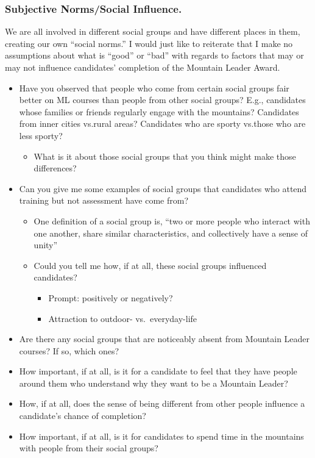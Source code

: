 \documentclass[
  12pt,
  a4paper,
]{book}
\providecommand{\tightlist}{%
  \setlength{\itemsep}{0pt}\setlength{\parskip}{0pt}}
\begin{document}
\hypertarget{subjective-normssocial-influence.}{%
\subsubsection{Subjective Norms/Social Influence.}\label{subjective-normssocial-influence.}}

We are all involved in different social groups and have different places in them, creating our own ``social norms.'' I would just like to reiterate that I make no assumptions about what is ``good'' or ``bad'' with regards to factors that may or may not influence candidates' completion of the Mountain Leader Award.

\begin{itemize}
\tightlist
\item
  Have you observed that people who come from certain social groups fair better on ML courses than people from other social groups? E.g., candidates whose families or friends regularly engage with the mountains? Candidates from inner cities vs.rural areas? Candidates who are sporty vs.those who are less sporty?

  \begin{itemize}
  \tightlist
  \item
    What is it about those social groups that you think might make those differences?
  \end{itemize}
\item
  Can you give me some examples of social groups that candidates who attend training but not assessment have come from?

  \begin{itemize}
  \tightlist
  \item
    One definition of a social group is, ``two or more people who interact with one another, share similar characteristics, and collectively have a sense of unity''
  \item
    Could you tell me how, if at all, these social groups influenced candidates?

    \begin{itemize}
    \tightlist
    \item
      Prompt: positively or negatively?
    \item
      Attraction to outdoor- vs.~everyday-life
    \end{itemize}
  \end{itemize}
\item
  Are there any social groups that are noticeably absent from Mountain Leader courses? If so, which ones?
\item
  How important, if at all, is it for a candidate to feel that they have people around them who understand why they want to be a Mountain Leader?
\item
  How, if at all, does the sense of being different from other people influence a candidate's chance of completion?
\item
  How important, if at all, is it for candidates to spend time in the mountains with people from their social groups?
\end{itemize}
\end{document}
